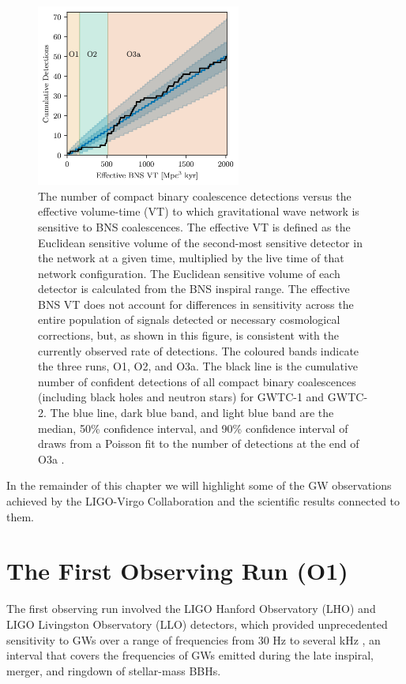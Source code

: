 \documentclass[binding=0.6cm, LaM]{sapthesis}
\begin{document}
        \begin{figure}[!t]
          \label{o3detection}
          \includegraphics[width=0.6\textwidth]{o3detection}
          \centering
          \caption{The number of compact binary coalescence detections versus the effective volume-time (VT) to which gravitational wave network is sensitive to BNS coalescences. The effective VT is defined as the Euclidean sensitive volume of the second-most sensitive detector in the network at a given time, multiplied by the live time of that network configuration. The Euclidean sensitive volume of each detector is calculated from the BNS inspiral range. The effective BNS VT does not account for differences in sensitivity across the entire population of signals detected or necessary cosmological corrections, but, as shown in this figure, is consistent with the currently observed rate of detections. The coloured bands indicate the three runs, O1, O2, and O3a. The black line is the cumulative number of confident detections of all compact binary coalescences (including black holes and neutron stars) for GWTC-1 and GWTC-2. The blue line, dark blue band, and light blue band are the median, 50\% confidence interval, and 90\% confidence interval of draws from a Poisson fit to the number of detections at the end of O3a \cite{49}.}
          \label{fig:o3detection}
        \end{figure}

        In the remainder of this chapter we will highlight some of the GW observations achieved 
	by the LIGO-Virgo Collaboration and the scientific results connected to them.

\section{The First Observing Run (O1)}
	The first observing run involved the LIGO Hanford Observatory (LHO) and LIGO Livingston Observatory (LLO) detectors, 
	which provided unprecedented sensitivity to GWs
	over a range of frequencies from 30 Hz to several kHz \cite{14}, an interval that
	covers the frequencies of GWs emitted during 
	the late inspiral, merger, and ringdown of stellar-mass BBHs.
\end{document}
